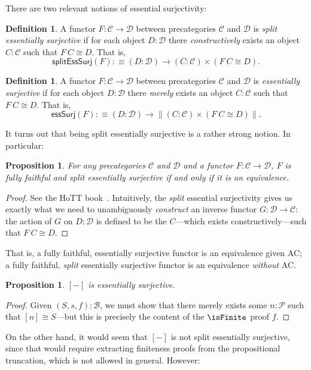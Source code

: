 \documentclass[preprint,authoryear]{sigplanconf}
\newcommand{\term}[1]{\emph{#1}}
\newcommand{\mcal}[1]{\ensuremath{\mathcal{#1}}}
\newcommand{\msf}[1]{\ensuremath{\mathsf{#1}}\xspace}
\let\oldequiv\equiv
\newcommand{\jeq}{\oldequiv}          %
\newcommand{\defeq}{\mathrel{:\jeq}}  %
\renewcommand{\equiv}{\simeq}         %
\newcommand{\iso}{\cong}              %
\newtheorem{prop}[thm]{Proposition}
\theoremstyle{definition}
\newtheorem{defn}[thm]{Definition}
\theoremstyle{remark}
\newcommand{\ptrunc}[1]{\ensuremath{\left\|#1\right\|}}
\newcommand{\CT}{\mcal{C}}
\newcommand{\DT}{\mcal{D}}
\newcommand{\BT}{\mcal{B}}
\newcommand{\PT}{\mcal{P}}
\newcommand{\fin}[1]{\ensuremath{[#1]}}
\begin{document}
There are two relevant notions of essential surjectivity:

\begin{defn}
  A functor $F : \CT \to \DT$ between precategories $\CT$ and $\DT$ is
  \term{split essentially surjective} if for each object $D : \DT$
  there \emph{constructively} exists an object $C : \CT$ such that $F\
  C \iso D$. That is, \[ \msf{splitEssSurj}(F) \defeq (D : \DT) \to (C :
  \CT) \times (F\ C \iso D). \]
\end{defn}

\begin{defn}
  A functor $F : \CT \to \DT$ between precategories $\CT$ and $\DT$ is
  \term{essentially surjective} if for each object $D : \DT$ there
  \emph{merely} exists an object $C : \CT$ such that $F\ C \iso D$. That
  is, \[ \msf{essSurj}(F) \defeq (D : \DT) \to \ptrunc{ (C : \CT)
    \times (F\ C \iso D) }. \]
\end{defn}

It turns out that being split essentially surjective is a rather
strong notion.  In particular:

\begin{prop}
  For any precategories $\CT$ and $\DT$ and a functor $F : \CT \to
  \DT$, $F$ is fully faithful and split essentially surjective if and
  only if it is an equivalence.
\end{prop}
\begin{proof}
  See the HoTT book~\citep[Lemma 9.4.5]{hottbook}.  Intuitively, the
  \emph{split} essential surjectivity gives us exactly what we need to
  unambiguously \emph{construct} an inverse functor $G : \DT \to \CT$:
  the action of $G$ on $D : \DT$ is defined to be the $C$---which
  exists constructively---such that $F\ C \iso D$.
\end{proof}

That is, a fully faithful, essentially surjective functor is an
equivalence given AC; a fully faithful, \emph{split} essentially
surjective functor is an equivalence \emph{without} AC.

\begin{prop}
  $\fin -$ is essentially surjective.
\end{prop}
\begin{proof}
  Given $(S,s,f) : \BT$, we must show that there merely exists some $n
  : \PT$ such that $\fin n \iso S$---but this is precisely the
  content of the $\isFinite$ proof $f$.
\end{proof}

On the other hand, it would seem that $\fin -$ is not split
essentially surjective, since that would require extracting finiteness
proofs from the propositional truncation, which is not allowed in
general.  However:
\end{document}
